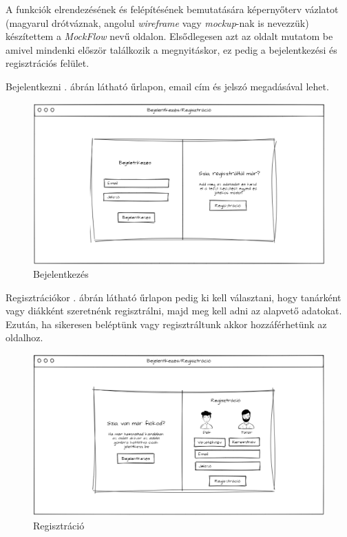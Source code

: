 
A funkciók elrendezésének és felépítésének bemutatására képernyőterv vázlatot (magyarul drótváznak, angolul \textit{wireframe} vagy \textit{mockup}-nak is nevezzük) készítettem a \textit{MockFlow} \cite{mockflow} nevű oldalon.
Elsődlegesen azt az oldalt mutatom be amivel mindenki először találkozik a megnyitáskor, ez pedig a bejelentkezési és regisztrációs felület.


Bejelentkezni . ábrán látható űrlapon, email cím és jelszó megadásával lehet.

\begin{figure}[h!]
    \centering
    \includegraphics[width=\linewidth]{images/login_wireframe.png}
    \caption{Bejelentkezés}
    \label{fig:login_wireframe}
\end{figure}

Regisztrációkor . ábrán látható űrlapon pedig ki kell választani, hogy tanárként vagy diákként szeretnénk regisztrálni, majd meg kell adni az alapvető adatokat.
Ezután, ha sikeresen beléptünk vagy regisztráltunk akkor hozzáférhetünk az oldalhoz.

\begin{figure}[h!]
    \centering
    \includegraphics[width=\linewidth]{images/signin_wireframe.png}
    \caption{Regisztráció}
    \label{fig:signin_wireframe}
\end{figure}

